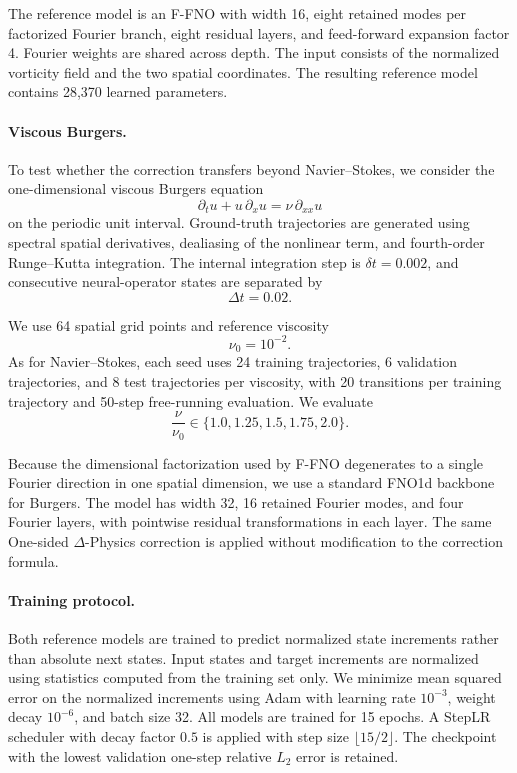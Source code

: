 \documentclass[10pt,twocolumn]{article}
\begin{document}
The reference model is an F-FNO with width 16, eight retained modes per
factorized Fourier branch, eight residual layers, and feed-forward expansion
factor 4. Fourier weights are shared across depth. The input consists of the
normalized vorticity field and the two spatial coordinates. The resulting
reference model contains 28,370 learned parameters.

\paragraph{Viscous Burgers.}
To test whether the correction transfers beyond Navier--Stokes, we consider
the one-dimensional viscous Burgers equation
\begin{equation}
    \partial_t u
    +
    u\,\partial_x u
    =
    \nu\,\partial_{xx}u
    \label{eq:burgers_exp}
\end{equation}
on the periodic unit interval. Ground-truth trajectories are generated using
spectral spatial derivatives, dealiasing of the nonlinear term, and
fourth-order Runge--Kutta integration. The internal integration step is
$\delta t=0.002$, and consecutive neural-operator states are separated by
\begin{equation}
    \Delta t = 0.02.
\end{equation}

We use 64 spatial grid points and reference viscosity
\begin{equation}
    \nu_0 = 10^{-2}.
\end{equation}
As for Navier--Stokes, each seed uses 24 training trajectories,
6 validation trajectories, and 8 test trajectories per viscosity, with
20 transitions per training trajectory and 50-step free-running evaluation.
We evaluate
\begin{equation}
    \frac{\nu}{\nu_0}
    \in
    \{1.0,1.25,1.5,1.75,2.0\}.
\end{equation}

Because the dimensional factorization used by F-FNO degenerates to a single
Fourier direction in one spatial dimension, we use a standard FNO1d
backbone for Burgers. The model has width 32, 16 retained Fourier modes,
and four Fourier layers, with pointwise residual transformations in each
layer. The same One-sided $\Delta$-Physics correction is applied without
modification to the correction formula.

\paragraph{Training protocol.}
Both reference models are trained to predict normalized state increments
rather than absolute next states. Input states and target increments are
normalized using statistics computed from the training set only. We minimize
mean squared error on the normalized increments using Adam with learning rate
$10^{-3}$, weight decay $10^{-6}$, and batch size 32. All models are trained
for 15 epochs. A StepLR scheduler with decay factor $0.5$ is applied with
step size $\lfloor 15/2\rfloor$. The checkpoint with the lowest validation
one-step relative $L_2$ error is retained.
\end{document}
